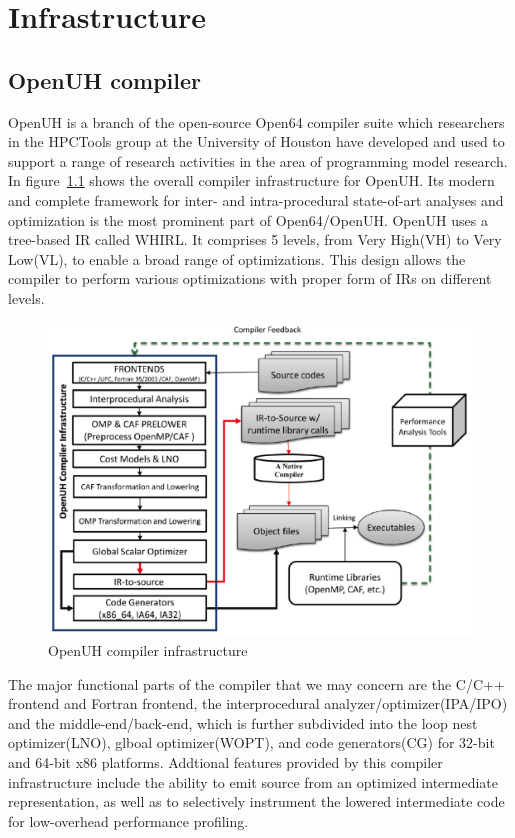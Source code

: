 \chapter{Infrastructure}\label{chap:Methods}
\section{OpenUH compiler}
OpenUH\cite{liao2007openuh}\cite{chapman2013experiences} is a branch of the open-source Open64 compiler suite which researchers in the HPCTools group at the University of Houston have developed and used to support a range of research activities in the area of programming model research. In figure~\ref{fig:openuhcompiler} shows the overall compiler infrastructure for OpenUH. Its modern and complete framework for inter- and intra-procedural state-of-art analyses and optimization is the most prominent part of Open64/OpenUH. OpenUH uses a tree-based IR called WHIRL. It comprises 5 levels, from Very High(VH) to Very Low(VL), to enable a broad range of optimizations. This design allows the compiler to perform various optimizations with proper form of IRs on different levels. 
\begin{figure}
\centering
\label{fig:openuhcompiler}
\includegraphics[scale=0.6]{figures/openuharchitecture}
\caption{OpenUH compiler infrastructure}
\end{figure}
The major functional parts of the compiler that we may concern are the C/C++ frontend and Fortran frontend, the interprocedural analyzer/optimizer(IPA/IPO) and the middle-end/back-end, which is further subdivided into the loop nest optimizer(LNO), glboal optimizer(WOPT), and code generators(CG) for 32-bit and 64-bit x86 platforms. Addtional features provided by this compiler infrastructure include the ability to emit source from an optimized intermediate representation, as well as to selectively instrument the lowered intermediate code for low-overhead performance profiling. 

